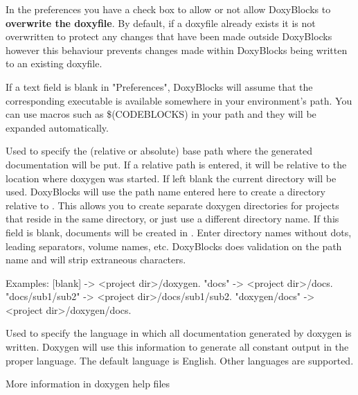 \begin{description}
\item In the preferences you have a check box to allow or not allow DoxyBlocks to \textbf{overwrite the doxyfile}. By default, if a doxyfile already exists it is not overwritten to protect any changes that have been made outside DoxyBlocks however this behaviour prevents changes made within DoxyBlocks being written to an existing doxyfile.
\item If a text field is blank in "Preferences", DoxyBlocks will assume that the corresponding executable is available somewhere in your environment's path. You can use macros such as \$(CODEBLOCKS) in your path and they will be expanded automatically.
\item [OUTPUT\_DIRECTORY] Used to specify the (relative or absolute) base path where the generated documentation will be put. If a relative path is entered, it will be relative to the location where doxygen was started. If left blank the current directory will be used. DoxyBlocks will use the path name entered here to create a directory relative to . This allows you to create separate doxygen directories for projects that reside in the same directory, or just use a different directory name. If this field is blank, documents will be created in . Enter directory names without dots, leading separators, volume names, etc. DoxyBlocks does validation on the path name and will strip extraneous characters.
\begin{code}
Examples:
[blank]           -> <project dir>/doxygen.
"docs"            -> <project dir>/docs.
"docs/sub1/sub2"  -> <project dir>/docs/sub1/sub2.
"doxygen/docs"    -> <project dir>/doxygen/docs.
\end{code}
\item [OUTPUT\_LANGUAGE] Used to specify the language in which all documentation generated by doxygen is written. Doxygen will use this information to generate all constant output in the proper language. The default language is English. Other languages are supported. 
\item More information in doxygen help files
\end{description}
